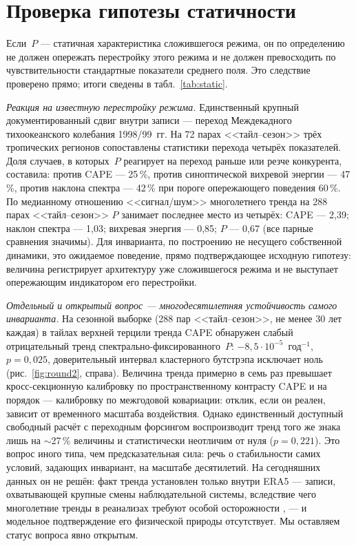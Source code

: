 \documentclass[11pt,a4paper]{article}
\begin{document}
\section{Проверка гипотезы статичности}
\label{sec:static}

Если~$P$ --- статичная характеристика сложившегося режима, он по определению не должен опережать перестройку этого режима и не должен превосходить по чувствительности стандартные показатели среднего поля. Это следствие проверено прямо; итоги сведены в табл.~\ref{tab:static}.

\emph{Реакция на известную перестройку режима.} Единственный крупный документированный сдвиг внутри записи --- переход Междекадного тихоокеанского колебания 1998/99~гг. На 72 парах <<тайл--сезон>> трёх тропических регионов сопоставлены статистики перехода четырёх показателей. Доля случаев, в которых~$P$ реагирует на переход раньше или резче конкурента, составила: против CAPE --- 25\,\%, против синоптической вихревой энергии --- 47\,\%, против наклона спектра --- 42\,\% при пороге опережающего поведения 60\,\%. По медианному отношению <<сигнал/шум>> многолетнего тренда на 288 парах <<тайл--сезон>> $P$ занимает последнее место из четырёх: CAPE --- 2,39; наклон спектра --- 1,03; вихревая энергия --- 0,85; $P$ --- 0,67 (все парные сравнения значимы). Для инварианта, по построению не несущего собственной динамики, это ожидаемое поведение, прямо подтверждающее исходную гипотезу: величина регистрирует архитектуру уже сложившегося режима и не выступает опережающим индикатором его перестройки.

\emph{Отдельный и открытый вопрос --- многодесятилетняя устойчивость самого инварианта.} На сезонной выборке (288 пар <<тайл--сезон>>, не менее 30 лет каждая) в тайлах верхней терцили тренда CAPE обнаружен слабый отрицательный тренд спектрально-фиксированного~$P$: $-8{,}5\cdot10^{-5}$~год$^{-1}$, $p=0{,}025$, доверительный интервал кластерного бутстрэпа исключает ноль (рис.~\ref{fig:round2}, справа). Величина тренда примерно в семь раз превышает кросс-секционную калибровку по пространственному контрасту CAPE и на порядок --- калибровку по межгодовой ковариации: отклик, если он реален, зависит от временного масштаба воздействия. Однако единственный доступный свободный расчёт с переходным форсингом воспроизводит тренд того же знака лишь на $\sim$27\,\% величины и статистически неотличим от нуля ($p=0{,}221$). Это вопрос иного типа, чем предсказательная сила: речь о стабильности самих условий, задающих инвариант, на масштабе десятилетий. На сегодняшних данных он не решён: факт тренда установлен только внутри ERA5 --- записи, охватывающей крупные смены наблюдательной системы, вследствие чего многолетние тренды в реанализах требуют особой осторожности \cite{Bengtsson2004}, --- и модельное подтверждение его физической природы отсутствует. Мы оставляем статус вопроса явно открытым.
\end{document}
